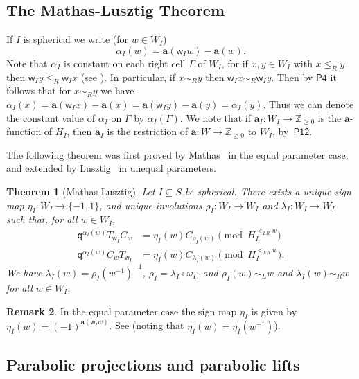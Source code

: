 \documentclass[11pt]{article}
\theoremstyle{plain}
\newtheorem{thm}{Theorem}[section]
\theoremstyle{definition}
\newtheorem{remark}[thm]{Remark}
\numberwithin{equation}{section}
\newcommand{\la}{\lambda}
\newcommand{\Ga}{\Gamma}
\def\ZZ{\mathbb{Z}}
\def\la{\lambda}
\def\la{\lambda}
\newcommand{\sw}{\mathsf{w}}
\newcommand{\ba}{\mathbf{a}}
\newcommand{\sq}{\mathsf{q}}
\begin{document}
\subsection{The Mathas-Lusztig Theorem}\label{sec:ML}

If $I$ is spherical we write (for $w\in W_I$)
$$
\alpha_I(w)=\ba(\sw_Iw)-\ba(w).
$$
Note that $\alpha_I$ is constant on each right cell $\Ga$ of $W_I$, for if $x,y\in W_I$ with $x\leq_R y$ then $\sw_I y\leq_R\sw_I x$ (see \cite[Corollary~11.7]{Lus:03}). In particular, if $x\sim_R y$ then $\sw_I x\sim_R\sw_I y$. Then by $\mathsf{P4}$ it follows that for $x\sim_R y$ we have $\alpha_I(x)=\ba(\sw_Ix)-\ba(x)=\ba(\sw_Iy)-\ba(y)=\alpha_I(y)$. Thus we can denote the constant value of $\alpha_I$ on $\Ga$ by $\alpha_I(\Ga)$. We note that if $\ba_I:W_I\to\ZZ_{\geq 0}$ is the $\ba$-function of $H_I$, then $\ba_I$ is the restriction of $\ba:W\to \ZZ_{\geq 0}$ to $W_I$, by~$\mathsf{P12}$. 



The following theorem was first proved by Mathas~\cite{Mat:96} in the equal parameter case, and extended by Lusztig~\cite[Theorem~2.3]{Lus:15} in unequal parameters. 

\begin{thm}[Mathas-Lusztig]\label{thm:ML}
Let $I\subseteq S$ be spherical. There exists a unique sign map $\eta_I:W_I\to \{-1,1\}$, and unique involutions $\rho_I:W_I\to W_I$ and $\lambda_I:W_I\to W_I$ such that, for all $w\in W_I$, 
\begin{align*}
\sq^{\alpha_I(w)}T_{\sw_I}C_w&=\eta_I(w)C_{\rho_I(w)}\pmod{H_I^{<_{LR}w}}\\
\sq^{\alpha_I(w)}C_wT_{\sw_I}&=\eta_I(w)C_{\lambda_I(w)}\pmod{H_I^{<_{LR}w}}.
\end{align*}
We have $\la_I(w)=\rho_I(w^{-1})^{-1}$, $\rho_I=\la_I\circ\omega_I$, and $\rho_I(w)\sim_L w$ and $\la_I(w)\sim_R w$ for all $w\in W_I$. 
\end{thm}

\begin{remark}\label{rem:etaequal}
In the equal parameter case the sign map $\eta_I$ is given by $\eta_I(w)=(-1)^{\ba(\sw_Iw)}$. See \cite[Example~17.3.2]{Bon:16} (noting that $\eta_I(w)=\eta_I(w^{-1})$). 
\end{remark}


\subsection{Parabolic projections and parabolic lifts}
\end{document}
